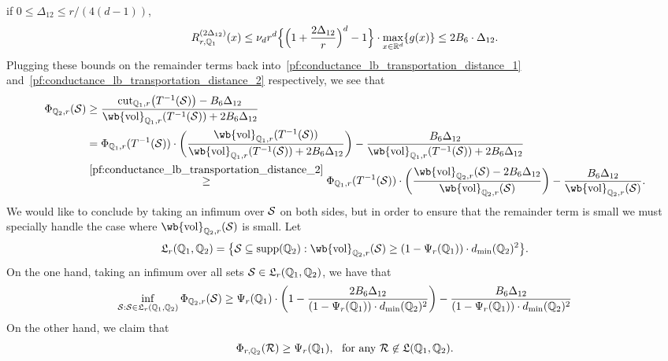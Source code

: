 	if $0 \leq \Delta_{12} \leq r/(4(d - 1))$,
	\begin{equation*}
	R_{r,\mathbb{Q}_1}^{(2\Delta_{12})}(x) \leq \nu_dr^d\Bigl\{\Bigl(1 + \frac{2\Delta_{12}}{r}\Bigr)^d - 1\Bigr\} \cdot \max_{x \in \mathbb{R}^d}\{g(x)\} \leq 2 B_6 \cdot \Delta_{12}.
	\end{equation*} 
	Plugging these bounds on the remainder terms back into~\eqref{pf:conductance_lb_transportation_distance_1} and~\eqref{pf:conductance_lb_transportation_distance_2} respectively, we see that
	\begin{align*}
	\Phi_{\mbb{Q}_2,r}(\mc{S}) & \geq \frac{\cut_{\mbb{Q}_1,r}\bigl(T^{-1}(\mc{S})\bigr) - B_6 \Delta_{12}}{\wb{\vol}_{\mbb{Q}_1,r}(T^{-1}(\mc{S})) + 2B_6 \Delta_{12}} \\ & = \Phi_{\mbb{Q}_1,r}(T^{-1}(\mc{S})) \cdot \biggl(\frac{\wb{\vol}_{\mbb{Q}_1,r}(T^{-1}(\mc{S}))}{\wb{\vol}_{\mbb{Q}_1,r}(T^{-1}(\mc{S})) + 2B_6\Delta_{12}}\biggr) - \frac{B_6\Delta_{12}}{\wb{\vol}_{\mbb{Q}_1,r}(T^{-1}(\mc{S})) + 2B_6\Delta_{12}} \\
	& \overset{\eqref{pf:conductance_lb_transportation_distance_2}}{\geq} \Phi_{\mbb{Q}_1,r}(T^{-1}(\mc{S})) \cdot \biggl(\frac{\wb{\vol}_{\mbb{Q}_2,r}(\mc{S}) - 2B_6\Delta_{12}}{\wb{\vol}_{\mbb{Q}_2,r}(\mc{S})}\biggr) - \frac{B_6\Delta_{12}}{\wb{\vol}_{\mbb{Q}_2,r}(\mc{S})}.
	\end{align*}
	We would like to conclude by taking an infimum over $\mathcal{S}$ on both sides, but in order to ensure that the remainder term is small we must specially handle the case where $\wb{\vol}_{\mbb{Q}_2,r}(\mc{S})$ is small. Let
	\begin{equation*}
	\mathfrak{L}_{r}(\mbb{Q}_1,\mbb{Q}_2) = \bigl\{\mc{S} \subseteq \mathrm{supp}(\mbb{Q}_2): \wb{\vol}_{\mbb{Q}_2,r}(\mc{S}) \geq (1 - \Psi_r(\mbb{Q}_1)) \cdot d_{\min}(\mbb{Q}_2)^2 \bigr\}.
	\end{equation*}
	On the one hand, taking an infimum over all sets $\mathcal{S} \in \mathfrak{L}_{r}(\mathbb{Q}_1,\mathbb{Q}_2)$, we have that
	\begin{equation*}
	\inf_{\mathcal{S}: \mathcal{S} \in \mathfrak{L}_{r}(\mathbb{Q}_1,\mathbb{Q}_2)} \Phi_{\mathbb{Q}_2,r}(\mathcal{S}) \geq \Psi_{r}(\mathbb{Q}_1) \cdot \biggl(1 - \frac{2 B_6 \Delta_{12}}{(1 - \Psi_r(\mathbb{Q}_1)) \cdot d_{\min}(\mathbb{Q}_2)^2}\biggr) - \frac{B_6\Delta_{12}}{(1 - \Psi_r(\mathbb{Q}_1)) \cdot d_{\min}(\mathbb{Q}_2)^2}
	\end{equation*}
	On the other hand, we claim that 
	\begin{equation}
	\label{pf:conductance_lb_transportation_distance_3}
	\Phi_{r,\mathbb{Q}_2}(\mathcal{R}) \geq \Psi_{r}(\mathbb{Q}_1),~~\textrm{for any $\mathcal{R} \not\in \mathfrak{L}(\mathbb{Q}_1,\mathbb{Q}_2)$}.
	\end{equation}
